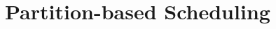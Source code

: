 \documentclass[conference]{IEEEtran}
\begin{document}
\section{Partition-based Scheduling}
\label{sec: partition-based scheduling}






\end{document}
